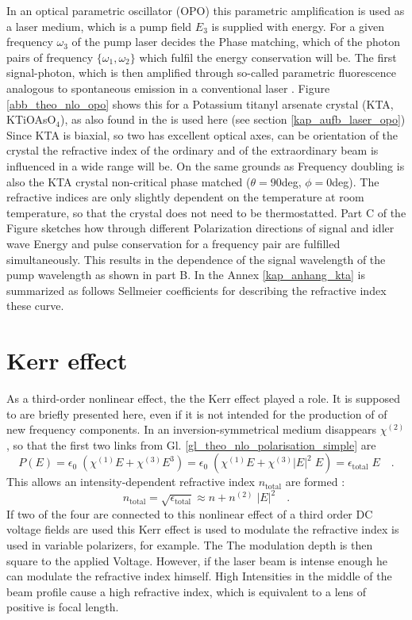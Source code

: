 In an optical parametric oscillator (OPO) this
parametric amplification is used as a laser medium, which is
a pump field $E_3$ is supplied with energy. For a given
frequency $\omega_3$ of the pump laser decides the
Phase matching, which of the photon pairs of frequency $\{
\omega_1, \omega_2 \}$ which fulfil the energy conservation
will be. The first signal-photon, which is then amplified
through so-called parametric fluorescence analogous to spontaneous
emission in a conventional laser \cite{Milonni_lasers}.
Figure \ref{abb_theo_nlo_opo} shows this for a
Potassium titanyl arsenate crystal (KTA, KTiOAsO$_4$), as also found in the
is used here (see section
\ref{kap_aufb_laser_opo}) Since KTA is biaxial, so two
has excellent optical axes, can be
orientation of the crystal the refractive index of the ordinary and
of the extraordinary beam is influenced in a wide range
will be. On the same grounds as
Frequency doubling is also the KTA crystal non-critical
phase matched ($\theta = 90$deg, $\phi = 0$deg). The refractive indices
are only slightly dependent on the temperature at room temperature, so
that the crystal does not need to be thermostatted. Part C of the
Figure sketches how through different
Polarization directions of signal and idler wave Energy and
pulse conservation for a frequency pair are fulfilled simultaneously.
This results in the dependence of the signal wavelength of
the pump wavelength as shown in part B. In the Annex
\ref{kap_anhang_kta} is summarized as follows
Sellmeier coefficients for describing the refractive index these
curve.

\section{Kerr effect}

As a third-order nonlinear effect, the
the Kerr effect played a role. It is supposed to
are briefly presented here, even if it is not intended for the production of
of new frequency components. In an inversion-symmetrical
medium disappears $\chi^{(2)}$, so that the first two links
from Gl. \ref{gl_theo_nlo_polarisation_simple} are
\begin{equation}
  P(E) = \epsilon_0 \; \left( \chi^{(1)} E + \chi^{(3)} E^3 \right)
  = \epsilon_0 \; \left( \chi^{(1)} E + \chi^{(3)} \left|E \right|^2 \; E
  \right) = \epsilon_{\text{total}} \; E \quad .
\end{equation}
This allows an intensity-dependent refractive index
$n_{\text{total}}$ are formed \cite{yariv_QE}:
\begin{equation}
 n_{\text{total}} = \sqrt{\epsilon_{\text{total}} } \approx n +
    n^{(2)} \; \left|E \right|^2 \quad.
\end{equation}
If two of the four are connected to this nonlinear effect of a third
order DC voltage fields are used
this Kerr effect is used to modulate the
refractive index is used in variable polarizers, for example. The
The modulation depth is then square to the applied
Voltage. However, if the laser beam is intense enough
he can modulate the refractive index himself. High
Intensities in the middle of the beam profile cause a high
refractive index, which is equivalent to a lens of positive
is focal length.



